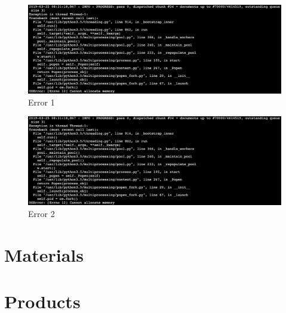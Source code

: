 \begin{figure}[htbp]
\centering
\includegraphics[width=\linewidth]{99-imgs/gensim_memory_allocation_error}
\caption{Error 1}
\label{fig:error-1}
\end{figure}

\begin{figure}[htbp]
\centering
\includegraphics[width=\linewidth]{99-imgs/gensim_memory_allocation_error}
\caption{Error 2}
\label{fig:error-2}
\end{figure}

\section{Materials}

\section{Products}



